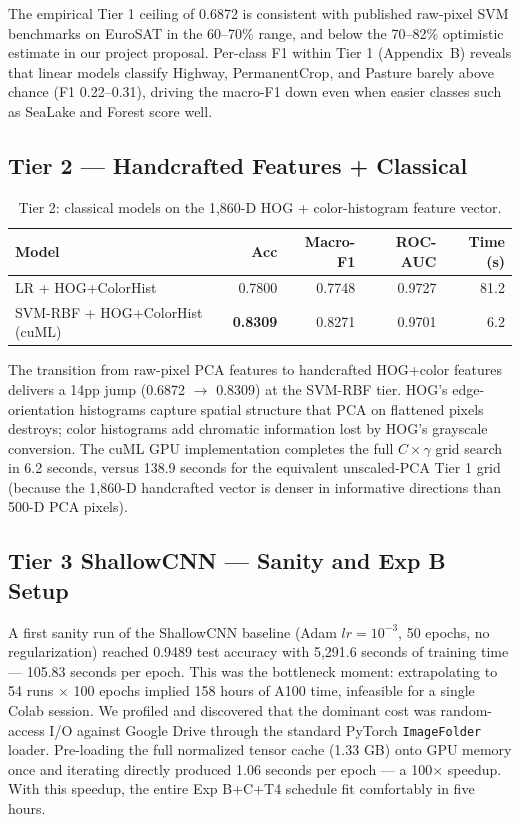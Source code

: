\documentclass[10pt,letterpaper]{article}
\begin{document}
The empirical Tier 1 ceiling of 0.6872 is consistent with published raw-pixel SVM benchmarks on EuroSAT in the 60--70\% range, and below the 70--82\% optimistic estimate in our project proposal. Per-class F1 within Tier 1 (Appendix~B) reveals that linear models classify Highway, PermanentCrop, and Pasture barely above chance (F1 0.22--0.31), driving the macro-F1 down even when easier classes such as SeaLake and Forest score well.

\subsection{Tier 2 --- Handcrafted Features + Classical}
\begin{table}[h]
\centering
\small
\caption{Tier 2: classical models on the 1{,}860-D HOG + color-histogram feature vector.}
\label{tab:tier2}
\begin{tabular}{lrrrr}
\toprule
\textbf{Model} & \textbf{Acc} & \textbf{Macro-F1} & \textbf{ROC-AUC} & \textbf{Time (s)} \\
\midrule
LR + HOG+ColorHist & 0.7800 & 0.7748 & 0.9727 & 81.2 \\
SVM-RBF + HOG+ColorHist (cuML) & \textbf{0.8309} & 0.8271 & 0.9701 & 6.2 \\
\bottomrule
\end{tabular}
\end{table}
The transition from raw-pixel PCA features to handcrafted HOG+color features delivers a 14pp jump (0.6872 $\rightarrow$ 0.8309) at the SVM-RBF tier. HOG's edge-orientation histograms capture spatial structure that PCA on flattened pixels destroys; color histograms add chromatic information lost by HOG's grayscale conversion. The cuML GPU implementation completes the full $C \times \gamma$ grid search in 6.2 seconds, versus 138.9 seconds for the equivalent unscaled-PCA Tier 1 grid (because the 1{,}860-D handcrafted vector is denser in informative directions than 500-D PCA pixels).

\subsection{Tier 3 ShallowCNN --- Sanity and Exp B Setup}
A first sanity run of the ShallowCNN baseline (Adam $lr{=}10^{-3}$, 50 epochs, no regularization) reached 0.9489 test accuracy with 5{,}291.6 seconds of training time --- 105.83 seconds per epoch. This was the bottleneck moment: extrapolating to 54 runs $\times$ 100 epochs implied 158 hours of A100 time, infeasible for a single Colab session. We profiled and discovered that the dominant cost was random-access I/O against Google Drive through the standard PyTorch \texttt{ImageFolder} loader. Pre-loading the full normalized tensor cache (1.33 GB) onto GPU memory once and iterating directly produced 1.06 seconds per epoch --- a 100$\times$ speedup. With this speedup, the entire Exp B+C+T4 schedule fit comfortably in five hours.
\end{document}
